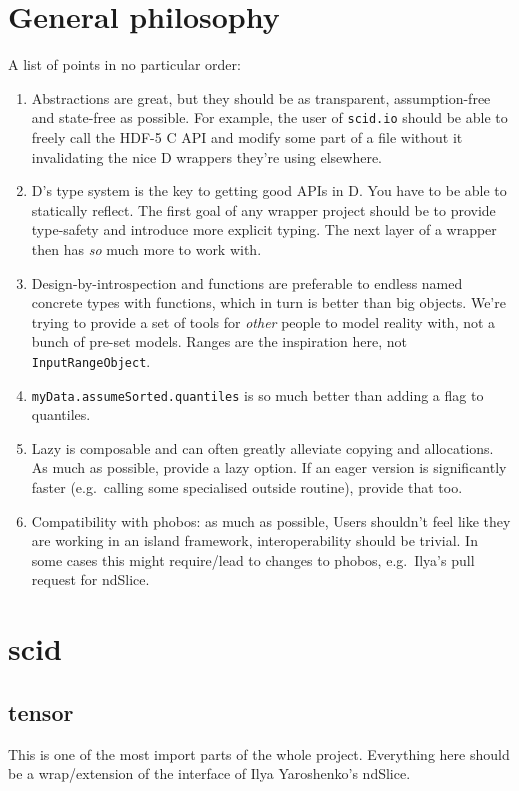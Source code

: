 \documentclass[10pt,a5paper,DIV=13]{scrartcl}
\begin{document}
\section{General philosophy}
A list of points in no particular order:
\begin{enumerate}
    \item Abstractions are great, but they should be as transparent, assumption-free and state-free as possible. For example, the user of \texttt{scid.io} should be able to freely call the HDF-5 C API and modify some part of a file without it invalidating the nice D wrappers they're using elsewhere.
        
    \item D's type system is the key to getting good APIs in D. You have to be able to statically reflect. The first goal of any wrapper project should be to provide type-safety and introduce more explicit typing. The next layer of a wrapper then has \emph{so} much more to work with.

    \item Design-by-introspection and functions are preferable to endless named concrete types with functions, which in turn is better than big objects. We're trying to provide a set of tools for \emph{other} people to model reality with, not a bunch of pre-set models. Ranges are the inspiration here, not \texttt{InputRangeObject}.

    \item \texttt{myData.assumeSorted.quantiles} is so much better than adding a flag to quantiles.

    \item Lazy is composable and can often greatly alleviate copying and allocations. As much as possible, provide a lazy option. If an eager version is significantly faster (e.g.\ calling some specialised outside routine), provide that too.

    \item Compatibility with phobos: as much as possible, Users shouldn't feel like they are working in an island framework, interoperability should be trivial. In some cases this might require/lead to changes to phobos, e.g.\ Ilya's pull request for ndSlice.
\end{enumerate}

\section{scid}
\subsection{tensor}
This is one of the most import parts of the whole project. Everything here should be a wrap/extension of the interface of Ilya Yaroshenko's ndSlice.
\end{document}

